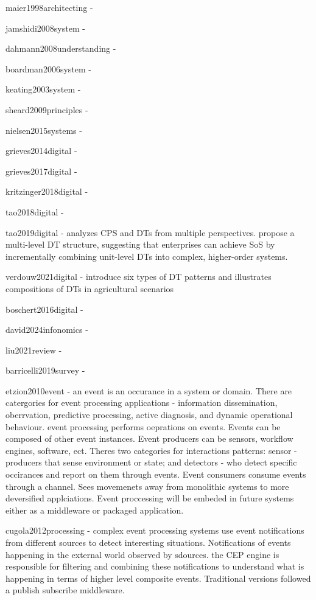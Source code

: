 
maier1998architecting - 

jamshidi2008system - 

dahmann2008understanding - 

boardman2006system - 

keating2003system - 

sheard2009principles - 

nielsen2015systems - 




\cite{boschert2016digital}


grieves2014digital - 

grieves2017digital -

kritzinger2018digital - 

tao2018digital - 

tao2019digital - analyzes CPS and DTs from multiple perspectives. propose a multi-level DT structure, suggesting that enterprises can achieve SoS by incrementally combining unit-level DTs into complex, higher-order systems.

verdouw2021digital - introduce six types of DT patterns and illustrates compositions of DTs in agricultural scenarios

boschert2016digital - 

david2024infonomics - 

liu2021review - 

barricelli2019survey - 





etzion2010event - an event is an occurance in a system or domain. There are catergories for event processing applications - information dissemination, oberrvation, predictive processing, active diagnosis, and dynamic operational behaviour. event processing performs oeprations on events. Events can be composed of other event instances. Event producers can be sensors, workflow engines, software, ect. Theres two categories for interactions patterns: sensor - producers that sense environment or state; and detectors - who detect specific occirances and report on them through events. Event consumers consume events through a channel. Sees movemenets away from monolithic systems to more deversified applciations. Event proccessing will be embeded in future systems either as a middleware or packaged application. 


cugola2012processing - complex event processing systems use event notifications from different sources to detect interesting situations. Notifications of events happening in the external world observed by sdources. the CEP engine is responsible for filtering and combining these notifications to understand what is happening in terms of higher level composite events. Traditional versions followed a publish subscribe middleware. 


